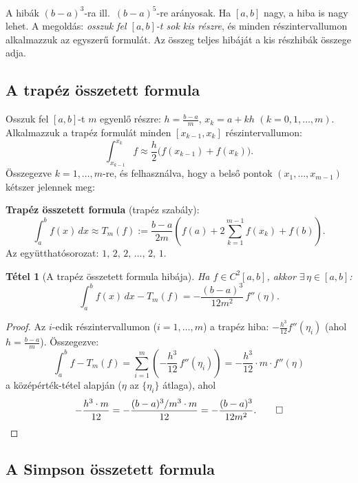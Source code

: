 \documentclass[a4paper,12pt]{article}
\theoremstyle{mydef}
\newtheorem{tetel}{Tétel}[section]
\begin{document}
A hibák $(b-a)^3$-ra ill.\ $(b-a)^5$-re arányosak. Ha $[a,b]$ nagy, a hiba
is nagy lehet. A megoldás: \emph{osszuk fel $[a,b]$-t sok kis részre}, és minden
részintervallumon alkalmazzuk az egyszerű formulát. Az összeg teljes hibáját
a kis részhibák összege adja.

\subsection*{A trapéz összetett formula}

Osszuk fel $[a,b]$-t $m$ egyenlő részre: $h = \tfrac{b-a}{m}$,
$x_k = a + kh$ $(k = 0, 1, \ldots, m)$.
Alkalmazzuk a trapéz formulát minden $[x_{k-1}, x_k]$ részintervallumon:
\[
  \int_{x_{k-1}}^{x_k} f \approx \frac{h}{2}\bigl(f(x_{k-1}) + f(x_k)\bigr).
\]
Összegezve $k = 1, \ldots, m$-re, és felhasználva, hogy a belső pontok $(x_1, \ldots, x_{m-1})$
kétszer jelennek meg:

\begin{mdframed}[backgroundcolor=thmbg,linewidth=0pt,innertopmargin=8pt,innerbottommargin=8pt]
\textbf{Trapéz összetett formula} (trapéz szabály):
\[
  \int_a^b f(x)\,dx \approx T_m(f) := \frac{b-a}{2m}
  \left(f(a) + 2\sum_{k=1}^{m-1} f(x_k) + f(b)\right).
\]
Az együtthatósorozat: $1,\,2,\,2,\,\ldots,\,2,\,1$.
\end{mdframed}

\begin{mdframed}[backgroundcolor=thmbg,linewidth=0pt,innertopmargin=8pt,innerbottommargin=8pt]
\begin{tetel}[A trapéz összetett formula hibája]
\label{tetel:trapezosszetett}
Ha $f \in C^2[a,b]$, akkor $\exists\,\eta \in [a,b]$:
\[
  \int_a^b f(x)\,dx - T_m(f) = -\frac{(b-a)^3}{12m^2}\,f''(\eta).
\]
\end{tetel}
\end{mdframed}

\begin{proof}
Az $i$-edik részintervallumon ($i = 1, \ldots, m$) a trapéz hiba:
$-\tfrac{h^3}{12}f''(\eta_i)$ (ahol $h = \tfrac{b-a}{m}$).
Összegezve:
\[
  \int_a^b f - T_m(f) = \sum_{i=1}^m \left(-\frac{h^3}{12}\,f''(\eta_i)\right)
  = -\frac{h^3}{12} \cdot m \cdot f''(\eta)
\]
a középérték-tétel alapján ($\eta$ az $\{\eta_i\}$ átlaga), ahol
\[
  -\frac{h^3 \cdot m}{12} = -\frac{(b-a)^3/m^3 \cdot m}{12} = -\frac{(b-a)^3}{12m^2}. \qed
\]
\end{proof}

\subsection*{A Simpson összetett formula}
\end{document}
